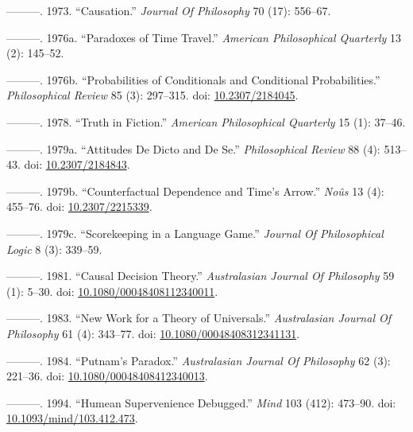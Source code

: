 \documentclass[
  10pt,
  letterpaper,
  DIV=11,
  numbers=noendperiod,
  twoside]{scrartcl}
\newlength{\cslhangindent}
\newenvironment{CSLReferences}[2] %
 {\begin{list}{}{%
  \setlength{\itemindent}{0pt}
  \setlength{\leftmargin}{0pt}
  \setlength{\parsep}{0pt}
  \ifodd #1
   \setlength{\leftmargin}{\cslhangindent}
   \setlength{\itemindent}{-1\cslhangindent}
  \fi
  \setlength{\itemsep}{#2\baselineskip}}}
 {\end{list}}
\begin{document}
\begin{CSLReferences}{1}{0}
---------. 1973. {``Causation.''} \emph{Journal Of Philosophy} 70 (17):
556--67.

---------. 1976a. {``Paradoxes of Time Travel.''} \emph{American
Philosophical Quarterly} 13 (2): 145--52.

---------. 1976b. {``Probabilities of Conditionals and Conditional
Probabilities.''} \emph{Philosophical Review} 85 (3): 297--315. doi:
\href{https://doi.org/10.2307/2184045}{10.2307/2184045}.

---------. 1978. {``Truth in Fiction.''} \emph{American Philosophical
Quarterly} 15 (1): 37--46.

---------. 1979a. {``Attitudes De Dicto and De Se.''}
\emph{Philosophical Review} 88 (4): 513--43. doi:
\href{https://doi.org/10.2307/2184843}{10.2307/2184843}.

---------. 1979b. {``Counterfactual Dependence and Time's Arrow.''}
\emph{Noûs} 13 (4): 455--76. doi:
\href{https://doi.org/10.2307/2215339}{10.2307/2215339}.

---------. 1979c. {``Scorekeeping in a Language Game.''} \emph{Journal
Of Philosophical Logic} 8 (3): 339--59.

---------. 1981. {``Causal Decision Theory.''} \emph{Australasian
Journal Of Philosophy} 59 (1): 5--30. doi:
\href{https://doi.org/10.1080/00048408112340011}{10.1080/00048408112340011}.

---------. 1983. {``New Work for a Theory of Universals.''}
\emph{Australasian Journal Of Philosophy} 61 (4): 343--77. doi:
\href{https://doi.org/10.1080/00048408312341131}{10.1080/00048408312341131}.

---------. 1984. {``Putnam's Paradox.''} \emph{Australasian Journal Of
Philosophy} 62 (3): 221--36. doi:
\href{https://doi.org/10.1080/00048408412340013}{10.1080/00048408412340013}.

---------. 1994. {``Humean Supervenience Debugged.''} \emph{Mind} 103
(412): 473--90. doi:
\href{https://doi.org/10.1093/mind/103.412.473}{10.1093/mind/103.412.473}.


\end{CSLReferences}
\end{document}
